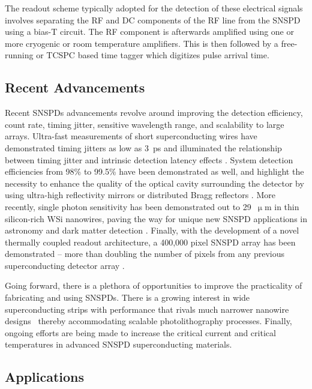 \documentclass[11pt]{caltech_thesis} %
\begin{document}
The readout scheme typically adopted for the detection of these electrical signals involves separating the RF and DC components of the RF line from the SNSPD using a bias-T circuit. The RF component is afterwards amplified using one or more cryogenic or room temperature amplifiers. This is then followed by a free-running or TCSPC based time tagger which digitizes pulse arrival time.

\hypertarget{recent-advancements}{%
\subsection{Recent Advancements}\label{recent-advancements}}

Recent SNSPDs advancements revolve around improving the detection efficiency, count rate, timing jitter, sensitive wavelength range, and scalability to large arrays. Ultra-fast measurements of short superconducting wires have demonstrated timing jitters as low as 3~ps and illuminated the relationship between timing jitter and intrinsic detection latency effects \autocite{Korzh2020}. System detection efficiencies from 98\% to 99.5\% have been demonstrated as well, and highlight the necessity to enhance the quality of the optical cavity surrounding the detector by using ultra-high reflectivity mirrors or distributed Bragg reflectors \autocite{reddy2020superconducting,99.5_Chang_2021}. More recently, single photon sensitivity has been demonstrated out to 29~$\upmu \mathrm{m}$ in thin silicon-rich WSi nanowires, paving the way for unique new SNSPD applications in astronomy and dark matter detection \autocite{taylor2023lownoise}. Finally, with the development of a novel thermally coupled readout architecture, a 400,000 pixel SNSPD array has been demonstrated -- more than doubling the number of pixels from any previous superconducting detector array \autocite{Oripov2023}.

Going forward, there is a plethora of opportunities to improve the practicality of fabricating and using SNSPDs. There is a growing interest in wide superconducting strips with performance that rivals much narrower nanowire designs~\autocite{Yabuno:23} thereby accommodating scalable photolithography processes. Finally, ongoing efforts are being made to increase the critical current and critical temperatures in advanced SNSPD superconducting materials.

\hypertarget{applications}{%
\subsection{Applications}\label{applications}}
\end{document}
